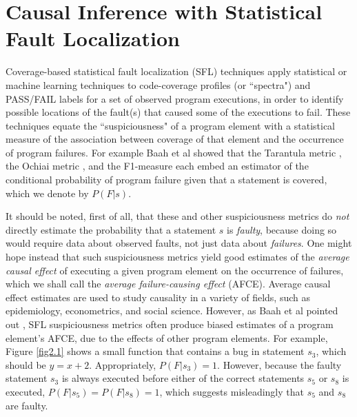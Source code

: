 \section{Causal Inference with Statistical Fault Localization}
Coverage-based statistical fault localization (SFL) techniques apply statistical or machine learning techniques to code-coverage profiles (or ``spectra") and PASS/FAIL labels for a set of observed program executions, in order to identify possible locations of the fault(s) that caused some of the executions to fail.  These techniques equate the ``suspiciousness" of a program element with a statistical measure of the association between coverage of that element and the occurrence of program failures.  For example Baah et al showed \cite{baah2010causal} that the Tarantula metric \cite{jones2002visualization}, the Ochiai metric \cite{abreu2007accuracy}, and the F1-measure \cite{baah2010causal} each embed an estimator of the conditional probability of program failure given that a statement  is covered, which we denote by $P(F|s)$.  

It should be noted, first of all, that these and other suspiciousness metrics do {\it not} directly estimate the probability that a statement $s$ is {\it faulty}, because doing so would require data about observed faults, not just data about {\it failures}.  One might hope instead that such suspiciousness metrics yield good estimates of the {\it average causal effect} \cite{pearl2000models} of executing a given program element on the occurrence of failures, which we shall call the {\it average failure-causing effect} (AFCE).  Average causal effect estimates are used to study causality in a variety of fields, such as epidemiology, econometrics, and social science.  However, as Baah et al pointed out \cite{baah2010causal}, SFL suspiciousness metrics often produce biased estimates of a program element’s AFCE, due to the effects of other program elements.  For example, Figure \ref{fig2.1} shows a small function that contains a bug in statement $s_3$, which should be $y=x+2$.  Appropriately, $P(F|s_3)=1$.  However, because the faulty statement $s_3$ is always executed before either of the correct statements $s_5$ or $s_8$ is executed, $P(F|s_5)=P(F|s_8)=1$, which suggests misleadingly that $s_5$ and $s_8$ are faulty.

